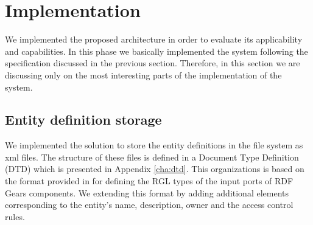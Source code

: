 \section{Implementation}
\label{sec:implStorage}

We implemented the proposed architecture in order to evaluate its applicability and capabilities. In this phase we basically implemented the system following the specification discussed in the previous section. Therefore, in this section we are discussing only on the most interesting parts of the implementation of the system.

\subsection{Entity definition storage}
We implemented the solution to store the entity definitions in the file system as xml files. The structure of these files is defined in a Document Type Definition (DTD) which is presented in Appendix \ref{cha:dtd}. This organizations is based on the format provided in \cite{maro2011} for defining the RGL types of the input ports of RDF Gears components. We extending this format by adding additional elements corresponding to the entity's name, description, owner and the access control rules.

